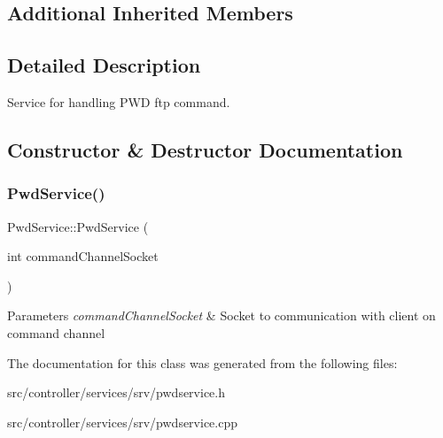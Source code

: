 \subsection*{Additional Inherited Members}


\subsection{Detailed Description}
Service for handling P\+WD ftp command. 

\subsection{Constructor \& Destructor Documentation}
\mbox{\label{classPwdService_a5008a00dba5c8867e11196c0c70e6e79}} 
\subsubsection{\texorpdfstring{Pwd\+Service()}{PwdService()}}
{\footnotesize\ttfamily Pwd\+Service\+::\+Pwd\+Service (\begin{DoxyParamCaption}\item[{int}]{command\+Channel\+Socket }\end{DoxyParamCaption})}


\begin{DoxyParams}{Parameters}
{\em command\+Channel\+Socket} & Socket to communication with client on command channel \\
\hline
\end{DoxyParams}


The documentation for this class was generated from the following files\+:\begin{DoxyCompactItemize}
\item 
src/controller/services/srv/pwdservice.\+h\item 
src/controller/services/srv/pwdservice.\+cpp\end{DoxyCompactItemize}
